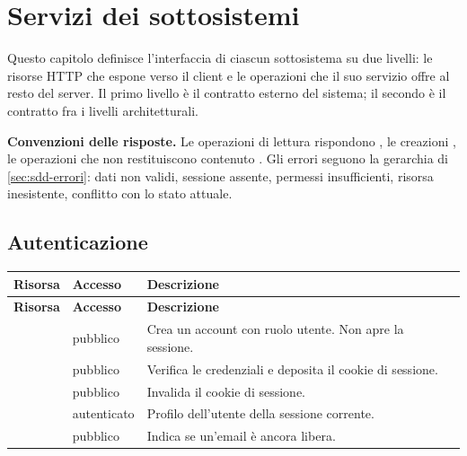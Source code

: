\chapter{Servizi dei sottosistemi}
\label{cap:sdd-servizi}

Questo capitolo definisce l'interfaccia di ciascun sottosistema su due
livelli: le risorse HTTP che espone verso il client e le operazioni che il
suo servizio offre al resto del server. Il primo livello è il contratto
esterno del sistema; il secondo è il contratto fra i livelli architetturali.

\begin{nota}
\textbf{Convenzioni delle risposte.} Le operazioni di lettura rispondono
, le creazioni , le operazioni che non restituiscono
contenuto . Gli errori seguono la gerarchia di
\cref{sec:sdd-errori}:  dati non validi,  sessione assente,
 permessi insufficienti,  risorsa inesistente,
 conflitto con lo stato attuale.
\end{nota}

\section{Autenticazione}

\begin{longtable}{@{}L{5.2cm} L{2.6cm} L{6.2cm}@{}}
\toprule
\textbf{Risorsa} & \textbf{Accesso} & \textbf{Descrizione} \\
\midrule
\endfirsthead
\toprule
\textbf{Risorsa} & \textbf{Accesso} & \textbf{Descrizione} \\
\midrule
\endhead
\bottomrule
\endlastfoot

 & pubblico &
Crea un account con ruolo utente. Non apre la sessione. \\

 & pubblico &
Verifica le credenziali e deposita il cookie di sessione. \\

 & pubblico &
Invalida il cookie di sessione. \\

 & autenticato &
Profilo dell'utente della sessione corrente. \\

 & pubblico &
Indica se un'email è ancora libera. \\

\end{longtable}

